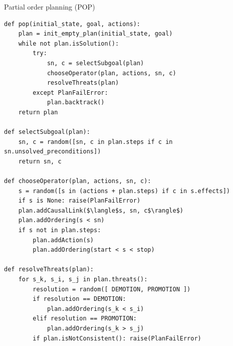 \begin{algorithm}
\caption{Partial order planning (POP)}
\begin{lstlisting}[mathescape=true]
def pop(initial_state, goal, actions):
    plan = init_empty_plan(initial_state, goal)
    while not plan.isSolution():
        try:
            sn, c = selectSubgoal(plan)
            chooseOperator(plan, actions, sn, c)
            resolveThreats(plan)
        except PlanFailError:
            plan.backtrack()
    return plan

def selectSubgoal(plan):
    sn, c = random([sn, c in plan.steps if c in sn.unsolved_preconditions])
    return sn, c

def chooseOperator(plan, actions, sn, c):
    s = random([s in (actions + plan.steps) if c in s.effects])
    if s is None: raise(PlanFailError)
    plan.addCausalLink($\langle$s, sn, c$\rangle$)
    plan.addOrdering(s < sn)
    if s not in plan.steps:
        plan.addAction(s)
        plan.addOrdering(start < s < stop)

def resolveThreats(plan):
    for s_k, s_i, s_j in plan.threats():
        resolution = random([ DEMOTION, PROMOTION ])
        if resolution == DEMOTION:
            plan.addOrdering(s_k < s_i)
        elif resolution == PROMOTION:
            plan.addOrdering(s_k > s_j)
        if plan.isNotConsistent(): raise(PlanFailError)
\end{lstlisting}
\end{algorithm}

